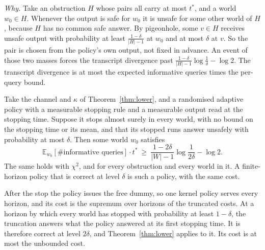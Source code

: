 
\emph{Why.} Take an obstruction $H$ whose pairs all carry at most $t^{*}$, and a world
$w_{0}\in H$. Whenever the output is safe for $w_{0}$ it is unsafe for some other world of $H$,
because $H$ has no common safe answer. By pigeonhole, some $v\in H$ receives unsafe output with
probability at least $\frac{1-\delta}{|H|-1}$ at $w_{0}$ and at most $\delta$ at $v$. So the pair
is chosen from the policy's own output, not fixed in advance. An event of those two masses
forces the transcript divergence past $\frac{1-\delta}{|H|-1}\log\frac1\delta-\log2$. The
transcript divergence is at most the expected informative queries times the per-query bound.

\begin{theorem}
\label{thm:lowerstop}
Take the channel and $\kappa$ of Theorem~\ref{thm:lower}, and a randomised adaptive policy with
a measurable stopping rule and a measurable output read at the stopping time. Suppose it stops
almost surely in every world, with no bound on the stopping time or its mean, and that its
stopped runs answer unsafely with probability at most $\delta$. Then some world $w_{0}$ satisfies
\[
\mathbb{E}_{w_{0}}[\#\text{informative queries}]\cdot t^{*}\ \ge\
\frac{1-2\delta}{|W|-1}\log\frac1{2\delta}-\log2 .
\]
The same holds with $\chi^{2}$, and for every obstruction and every world in it. A finite-horizon
policy that is correct at level $\delta$ is such a policy, with the same cost.
\end{theorem}


After the stop the policy issues the free dummy, so one kernel policy serves every horizon, and
its cost is the supremum over horizons of the truncated costs. At a horizon by which every world
has stopped with probability at least $1-\delta$, the truncation answers what the policy answered
at its first stopping time. It is therefore correct at level $2\delta$, and
Theorem~\ref{thm:lower} applies to it. Its cost is at most the unbounded cost.

